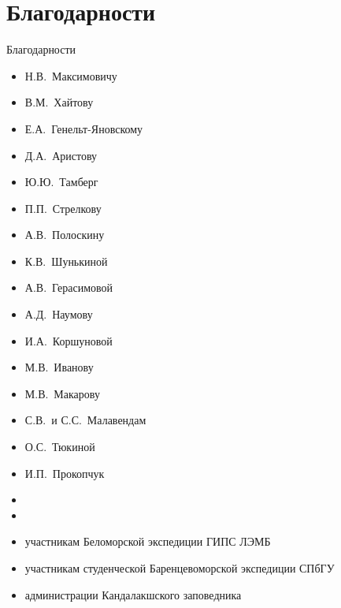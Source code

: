 \documentclass{beamer}
\begin{document}
		\section*{Благодарности}
\begin{small}
\begin{frame}{Благодарности}
\begin{multicols}{2}
	\begin{itemize}
		\item{Н.\:В.~Максимовичу}
		\item{В.\:М.~Хайтову}
		\item{Е.\:А.~Генельт-Яновскому}
		\item{Д.\:А.~Аристову} 
		\item{Ю.\:Ю.~Тамберг}
		\item{П.\:П.~Стрелкову}
		\item{А.\:В.~Полоскину}
		\item{К.\:В.~Шунькиной}
		\item{А.\:В.~Герасимовой}
		\item{А.\:Д.~Наумову}
		\item{И.\:А.~Коршуновой}
		\item{М.В.~Иванову}
		\item{М.\:В.~Макарову}
		\item{С.\:В.~и С.\:С.~Малавендам}
		\item{О.\:С.~Тюкиной}
		\item{И.\:П.~Прокопчук}
		\item{}
		\item{}
		\item{участникам Беломорской экспедиции ГИПС ЛЭМБ}
		\item{участникам студенческой Баренцевоморской экспедиции СПбГУ}
		\item{администрации Кандалакшского заповедника}
	\end{itemize}
\end{multicols}
\end{frame}
\end{small}
\end{document}
